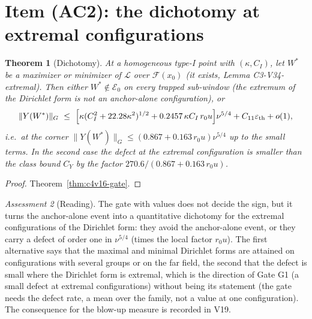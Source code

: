 \documentclass[11pt]{article}
\theoremstyle{plain}
\newtheorem{theorem}{Theorem}[section]
\theoremstyle{definition}
\theoremstyle{remark}
\newtheorem{assessment}[theorem]{Assessment}
\begin{document}
\section{Item (AC2): the dichotomy at extremal configurations}
\label{sec:c4v17-dichotomy}

\begin{theorem}[Dichotomy]
\label{thm:c4v17-dichotomy}
At a homogeneous type-I point with \((\kappa,C_I)\), let \(W^*\) be a maximizer or
minimizer of \(\mathcal L\) over \(\mathcal F(x_0)\) (it exists, Lemma C3-V34-extremal).  Then
either \(W^*\notin\mathcal E_0\) on every trapped sub-window (the extremum of the
Dirichlet form is not an anchor-alone configuration), or
\begin{equation}
 \|Y(W^*)\|_G\ \le\ \Bigl[\kappa(C_I^2+22.28\kappa^2)^{1/2}+0.2457\,\kappa C_I\,r_0u\Bigr]\nu^{5/4}+C_{11}\varepsilon_{\rm th}+o(1),
 \label{eq:c4v17-dichotomy}
\end{equation}
i.e.\ at the corner \(\|Y(W^*)\|_G\le(0.867+0.163\,r_0u)\nu^{5/4}\) up to the small terms.
In the second case the defect at the extremal configuration is
smaller than the class bound \(C_Y\) by the factor
\(270.6/(0.867+0.163\,r_0u)\).
\end{theorem}

\begin{proof}
Theorem~\ref{thm:c4v16-gate}.
\end{proof}

\begin{assessment}[Reading]
\label{ass:c4v17-reading}
The gate with values does not decide the sign, but it turns the
anchor-alone event into a quantitative dichotomy for the extremal
configurations of the Dirichlet form: they avoid the anchor-alone
event, or they carry a defect of order one in \(\nu^{5/4}\) (times the
local factor \(r_0u\)).  The first alternative says that the maximal and
minimal Dirichlet forms are attained on configurations with several
groups or on the far field, the second that the defect is small
where the Dirichlet form is extremal, which is the direction of
Gate G1 (a small defect at extremal configurations) without being
its statement (the gate needs the defect rate, a mean over the
family, not a value at one configuration).  The consequence for the
blow-up measure is recorded in V19.
\end{assessment}
\end{document}
